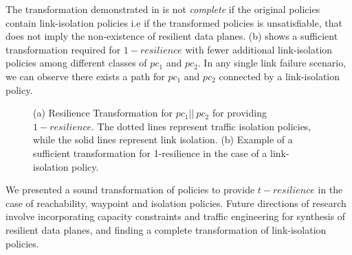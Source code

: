 \noindent The transformation demonstrated in  is not \emph{complete}
 if the original policies contain link-isolation policies i.e if the transformed policies
 is unsatisfiable, that does not imply the non-existence of resilient data planes. 
 (b) shows a sufficient transformation required for $1-resilience$ 
 with fewer additional link-isolation policies among different classes
 of $pc_1$ and $pc_2$. In any single link failure scenario, we can observe
 there exists a path
 for $pc_1$ and $pc_2$ connected by a link-isolation policy.
\begin{figure}
	\centering
	\caption{\label{fig:restransform}
		(a) Resilience Transformation for $pc_1 || \ pc_2$ for providing $1-resilience$. 
		The dotted lines represent traffic isolation policies, 
		while the solid lines represent link isolation. (b) Example of a sufficient transformation
		for 1-resilience in the case of a link-isolation policy.}
\end{figure}

We presented a sound transformation of policies to provide $t-resilience$ in
the case of reachability, waypoint and isolation policies. Future directions of 
research involve incorporating capacity constraints and traffic engineering
for synthesis of resilient data planes, and finding a complete transformation of
link-isolation policies.